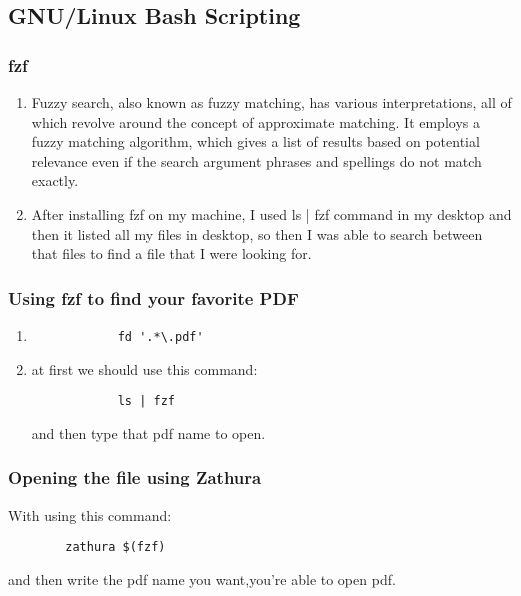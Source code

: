 \documentclass[titlepage]{article}
\begin{document}
	\subsection{GNU/Linux Bash Scripting}
	\subsubsection{fzf}
	\begin{enumerate}
		\item Fuzzy search, also known as fuzzy matching, has various interpretations, all of which revolve around the concept of approximate matching. It employs a fuzzy matching algorithm, which gives a list of results based on potential relevance even if the search argument phrases and spellings do not match exactly.
		\item After installing fzf on my machine, I used ls | fzf command in my desktop and then it listed all my files in desktop, so then I was able to search between that files to find a file that I were looking for.
	\end{enumerate}
	\subsubsection{ Using fzf to find your favorite PDF}
	\begin{enumerate}
		\item \begin{lstlisting}
			fd '.*\.pdf'
		\end{lstlisting}
		\item at first we should use this command:
		\begin{lstlisting}
			ls | fzf
		\end{lstlisting}
		and then type that pdf name to open.
	\end{enumerate}
	\subsubsection{Opening the file using Zathura}
	With using this command:
	\begin{lstlisting}
		zathura $(fzf)
	\end{lstlisting}
	and then write the pdf name you want,you're able to open pdf.
	
	
	
\end{document}
